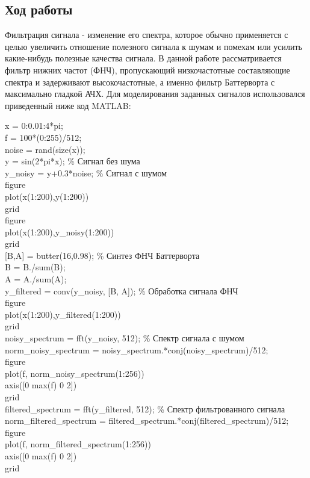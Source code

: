 \documentclass[10pt,a4paper]{article}
\begin{document}
\subsection{Ход работы}
Фильтрация сигнала - изменение его спектра, которое обычно применяется с целью увеличить отношение полезного сигнала к шумам и помехам или усилить какие-нибудь полезные качества сигнала.
В данной работе рассматривается фильтр нижних частот (ФНЧ), пропускающий низкочастотные составляющие спектра и задерживают высокочастотные, а именно фильтр Баттерворта с максимально гладкой АЧХ.  
Для моделирования заданных сигналов использовался приведенный ниже код MATLAB:
\begin{flushleft}

x = 0:0.01:4*pi;\\
f = 100*(0:255)/512;\\

noise = rand(size(x));\\
y = sin(2*pi*x);            \% Сигнал без шума\\
y\_noisy = y+0.3*noise;      \% Сигнал с шумом\\

figure\\
plot(x(1:200),y(1:200))\\
grid\\

figure\\
plot(x(1:200),y\_noisy(1:200))\\
grid\\

[B,A] = butter(16,0.98);    \% Синтез ФНЧ Баттерворта\\
B = B./sum(B);\\
A = A./sum(A);\\
                      
y\_filtered = conv(y\_noisy, [B, A]); \% Обработка сигнала ФНЧ\\

figure\\
plot(x(1:200),y\_filtered(1:200))\\
grid\\

noisy\_spectrum = fft(y\_noisy, 512); \% Спектр сигнала с шумом\\
norm\_noisy\_spectrum = noisy\_spectrum.*conj(noisy\_spectrum)/512;\\

figure\\
plot(f, norm\_noisy\_spectrum(1:256))\\
axis([0 max(f) 0 2])\\
grid \\

filtered\_spectrum = fft(y\_filtered, 512);   \% Спектр фильтрованного сигнала\\
norm\_filtered\_spectrum = filtered\_spectrum.*conj(filtered\_spectrum)/512;\\

figure\\
plot(f, norm\_filtered\_spectrum(1:256))\\
axis([0 max(f) 0 2])\\
grid\\


\end{flushleft}
\end{document}
